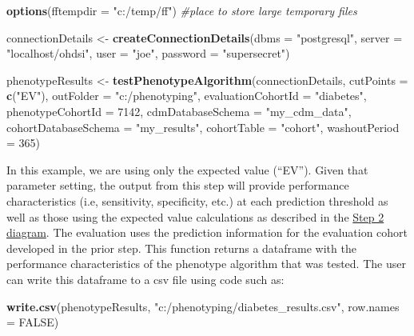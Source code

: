\documentclass[
]{article}
\newenvironment{Shaded}{\begin{snugshade}}{\end{snugshade}}
\newcommand{\CommentTok}[1]{\textcolor[rgb]{0.56,0.35,0.01}{\textit{#1}}}
\newcommand{\DataTypeTok}[1]{\textcolor[rgb]{0.13,0.29,0.53}{#1}}
\newcommand{\DecValTok}[1]{\textcolor[rgb]{0.00,0.00,0.81}{#1}}
\newcommand{\KeywordTok}[1]{\textcolor[rgb]{0.13,0.29,0.53}{\textbf{#1}}}
\newcommand{\NormalTok}[1]{#1}
\newcommand{\OtherTok}[1]{\textcolor[rgb]{0.56,0.35,0.01}{#1}}
\newcommand{\StringTok}[1]{\textcolor[rgb]{0.31,0.60,0.02}{#1}}
\begin{document}
\begin{Shaded}
\begin{Highlighting}[]
\KeywordTok{options}\NormalTok{(}\DataTypeTok{fftempdir =} \StringTok{"c:/temp/ff"}\NormalTok{) }\CommentTok{#place to store large temporary files}

\NormalTok{connectionDetails <-}\StringTok{ }\KeywordTok{createConnectionDetails}\NormalTok{(}\DataTypeTok{dbms =} \StringTok{"postgresql"}\NormalTok{,}
                                              \DataTypeTok{server =} \StringTok{"localhost/ohdsi"}\NormalTok{,}
                                              \DataTypeTok{user =} \StringTok{"joe"}\NormalTok{,}
                                              \DataTypeTok{password =} \StringTok{"supersecret"}\NormalTok{)}

\NormalTok{phenotypeResults <-}\StringTok{ }\KeywordTok{testPhenotypeAlgorithm}\NormalTok{(connectionDetails,}
                                   \DataTypeTok{cutPoints =} \KeywordTok{c}\NormalTok{(}\StringTok{"EV"}\NormalTok{),}
                                   \DataTypeTok{outFolder =} \StringTok{"c:/phenotyping"}\NormalTok{,}
                                   \DataTypeTok{evaluationCohortId =} \StringTok{"diabetes"}\NormalTok{,}
                                   \DataTypeTok{phenotypeCohortId =} \DecValTok{7142}\NormalTok{,}
                                   \DataTypeTok{cdmDatabaseSchema =} \StringTok{"my_cdm_data"}\NormalTok{,}
                                   \DataTypeTok{cohortDatabaseSchema =} \StringTok{"my_results"}\NormalTok{,}
                                   \DataTypeTok{cohortTable  =} \StringTok{"cohort"}\NormalTok{,}
                                   \DataTypeTok{washoutPeriod =} \DecValTok{365}\NormalTok{)}
\end{Highlighting}
\end{Shaded}

In this example, we are using only the expected value (``EV''). Given
that parameter setting, the output from this step will provide
performance characteristics (i.e, sensitivity, specificity, etc.) at
each prediction threshold as well as those using the expected value
calculations as described in the \href{vignettes/Figure3.png}{Step 2
diagram}. The evaluation uses the prediction information for the
evaluation cohort developed in the prior step. This function returns a
dataframe with the performance characteristics of the phenotype
algorithm that was tested. The user can write this dataframe to a csv
file using code such as:

\begin{Shaded}
\begin{Highlighting}[]
      \KeywordTok{write.csv}\NormalTok{(phenotypeResults, }\StringTok{"c:/phenotyping/diabetes_results.csv"}\NormalTok{, }\DataTypeTok{row.names =} \OtherTok{FALSE}\NormalTok{)}
\end{Highlighting}
\end{Shaded}
\end{document}
